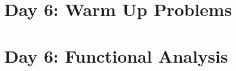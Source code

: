 \documentclass[answers]{exam}
\theoremstyle{problemstyle}
\newcommand{\vt}{\vskip 5mm} %
\newcommand{\norm}[1]{\left\lVert#1\right\rVert} %
\newcommand{\1}[1]{\textbf{1}_{\left[#1\right]}} %
\begin{document}
\begin{questions}
\begin{solution}
\begin{comment}
  \vt
  \noindent  \textit{Claim 2:} If $m\neq n$ then $\norm{x_{n}-x_{m}}_{L^{2}([0,1])}\geq \sqrt{2}$.
  \begin{proof}[Proof of Claim 2:]
    Suppose $m\neq n$. Denote $c_{n}= \frac{n+1}{n}$. Then 
    \begin{align*}
      \norm{x_{n}-x_{m}}^{2}_{L^{2}([0,1])}
      &= \langle x_{n}-x_{m}, x_{n}-x_{m}\rangle\\
      &= \langle c_{n} e_{n}-c_{m} e_{m},  c_{n}e_{n}- c_{m}e_{m}\rangle\\
      &=c_{n}^{2}\langle e_{n},e_{n}\rangle -2c_{m}c_{n}\langle e_{n},e_{m}\rangle + c_{m}^{2}\langle e_{m},e_{m}\rangle\\
      &= c_{n}^{2}+ c_{m}^{2}
    \end{align*}
    where the final equality is justified by Claim 1. It follows that
    \begin{equation*}
       \norm{x_{n}-x_{m}}_{L^{2}([0,1])} = \sqrt{c_{n}^{2}+c_{m}^{2}} = \sqrt{\left(1+ \frac{1}{n} \right)^{2}  + \left( 1+\frac{1}{m} \right)^{2}}\geq \sqrt{2}.
     \end{equation*}
     This proves claim 2.
  \end{proof}



Using Claim 1, we see that $\norm{x_{n}}_{L^2([0,1])} = \left( \frac{n+1}{n} \right)\norm{e_{n}}_{L^{2}([0,1])} = 1+\frac{1}{n}$, and from this it is clear that $(x_{n})$ has no element of smallest norm. The fact that $x_{n}$ is closed follows from Claim 2, which implies that any convergent sequence consisting of elements in $\left\{ x_{n} \right\}_{n}$ is eventually constant, and hence its limit point must again be an element in $\left\{ x_{n} \right\}_{n}$.
\end{comment}

  
\end{solution}






\newpage
\section*{Day 6: Warm Up Problems}


\newpage
\section{Day 6: Functional Analysis}


\end{questions}
\end{document}
